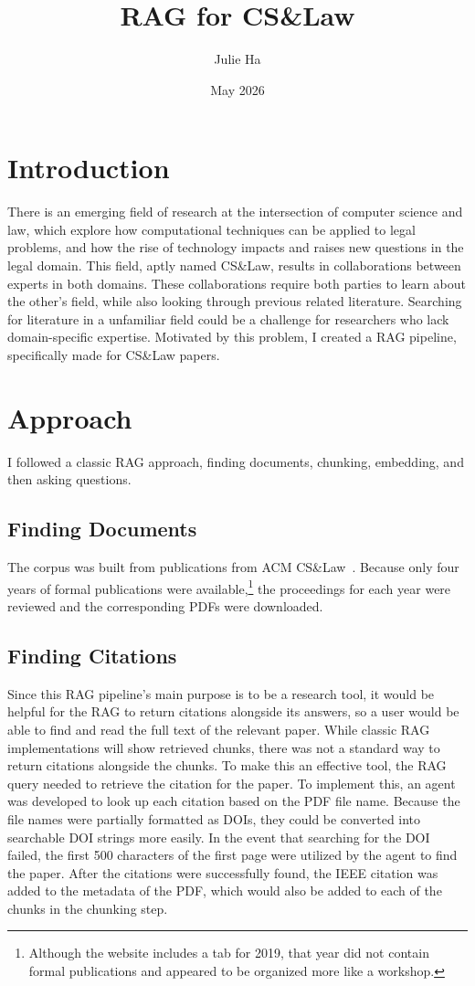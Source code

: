 \documentclass{article}
\title{RAG for CS\&Law}
\author{Julie Ha}
\date{May 2026}
\begin{document}
\maketitle
\section{Introduction}
There is an emerging field of research at the intersection of computer science and law, which explore how computational techniques can be applied to legal problems, and how the rise of technology impacts and raises new questions in the legal domain. 
This field, aptly named CS\&Law, results in collaborations between experts in both domains. 
These collaborations require both parties to learn about the other's field, while also looking through previous related literature. 
Searching for literature in a unfamiliar field could be a challenge for researchers who lack domain-specific expertise. 
Motivated by this problem, I created a RAG pipeline, specifically made for CS\&Law papers. 

\section{Approach}
I followed a classic RAG approach, finding documents, chunking, embedding, and then asking questions. 
\subsection{Finding Documents}
The corpus was built from publications from ACM CS\&Law~\cite{cslaw_2026}.
Because only four years of formal publications were available,\footnote{Although the website includes a tab for 2019, that year did not contain formal publications and appeared to be organized more like a workshop.} the proceedings for each year were reviewed and the corresponding PDFs were downloaded. 

\subsection{Finding Citations}
Since this RAG pipeline's main purpose is to be a research tool, it would be helpful for the RAG to return citations alongside its answers, so a user would be able to find and read the full text of the relevant paper. 
While classic RAG implementations will show retrieved chunks, there was not a standard way to return citations alongside the chunks. 
To make this an effective tool, the RAG query needed to retrieve the citation for the paper. 
To implement this, an agent was developed to look up each citation based on the PDF file name. 
Because the file names were partially formatted as DOIs, they could be converted into searchable DOI strings more easily. 
In the event that searching for the DOI failed, the first 500 characters of the first page were utilized by the agent to find the paper.
After the citations were successfully found, the IEEE citation was added to the metadata of the PDF, which would also be added to each of the chunks in the chunking step. 
\end{document}
